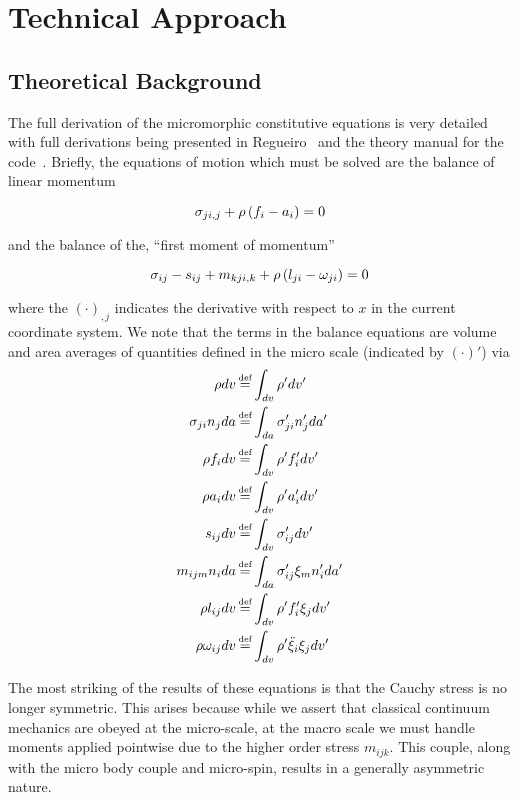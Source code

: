 \section{Technical Approach}

\subsection{Theoretical Background}

The full derivation of the micromorphic constitutive equations is very detailed with full derivations being presented in Regueiro~\cite{bib:regueiro_micro10} and the theory manual for the code~\cite{bib:miller17}. Briefly, the equations of motion which must be solved are the balance of linear momentum

\begin{equation}
\sigma_{ji,j} + \rho \left(f_i - a_i\right) = 0\\
\end{equation}

and the balance of the, ``first moment of momentum''

\begin{equation}
\sigma_{ij} - s_{ij} + m_{kji,k} + \rho \left(l_{ji} - \omega_{ji}\right) = 0\\
\end{equation}

where the $\left(\cdot\right)_{,j}$ indicates the derivative with respect to $x$ in the current coordinate system. We note that the terms in the balance equations are volume and area averages of quantities defined in the micro scale (indicated by $\left(\cdot\right)'$) via
\begin{align*}
\rho dv &\defeq \int_{dv} \rho' dv'\\
\sigma_{ji}n_j da &\defeq \int_{da} \sigma_{ji}'n_j'da'\\
\rho f_i dv &\defeq \int_{dv} \rho' f_i' dv'\\
\rho a_i dv &\defeq \int_{dv} \rho' a_i' dv'\\
s_{ij} dv &\defeq \int_{dv} \sigma_{ij}' dv'\\
m_{ijm} n_i da &\defeq \int_{da} \sigma_{ij}' \xi_m n_i' da'\\
\rho l_{ij} dv &\defeq \int_{dv} \rho' f_i' \xi_j dv'\\
\rho \omega_{ij} dv &\defeq \int_{dv} \rho' \ddot{\xi}_i \xi_j dv'\\
\end{align*}

The most striking of the results of these equations is that the Cauchy stress is no longer symmetric. This arises because while we assert that classical continuum mechanics are obeyed at the micro-scale, at the macro scale we must handle moments applied pointwise due to the higher order stress $m_{ijk}$. This couple, along with the micro body couple and micro-spin, results in a generally asymmetric nature.

